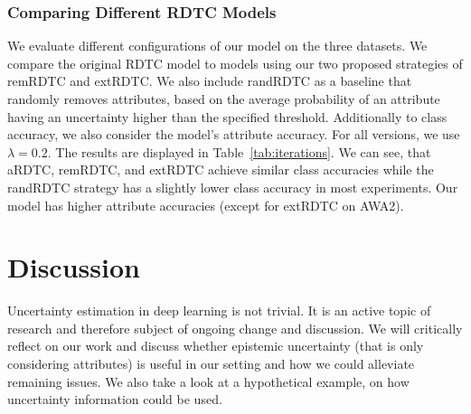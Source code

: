 \documentclass[a4paper,cleardoubleempty,BCOR1cm, 11pt]{report}
\begin{document}
\subsection{Comparing Different RDTC Models}
We evaluate different configurations of our model on the three datasets. We compare the original RDTC model to models using our two proposed strategies of remRDTC and extRDTC. We also include randRDTC as a baseline that randomly removes attributes, based on the average probability of an attribute having an uncertainty higher than the specified threshold. Additionally to class accuracy, we also consider the model's attribute accuracy. For all versions, we use $\lambda=0.2$. The results are displayed in Table~\ref{tab:iterations}. We can see, that aRDTC, remRDTC, and extRDTC achieve similar class accuracies while the randRDTC strategy has a slightly lower class accuracy in most experiments. Our model has higher attribute accuracies (except for extRDTC on AWA2). %











\chapter{Discussion}
Uncertainty estimation in deep learning is not trivial. It is an active topic of research and therefore subject of ongoing change and discussion. We will critically reflect on our work and discuss whether epistemic uncertainty (that is only considering attributes) is useful in our setting and how we could alleviate remaining issues. We also take a look at a hypothetical example, on how uncertainty information could be used.


\end{document}
